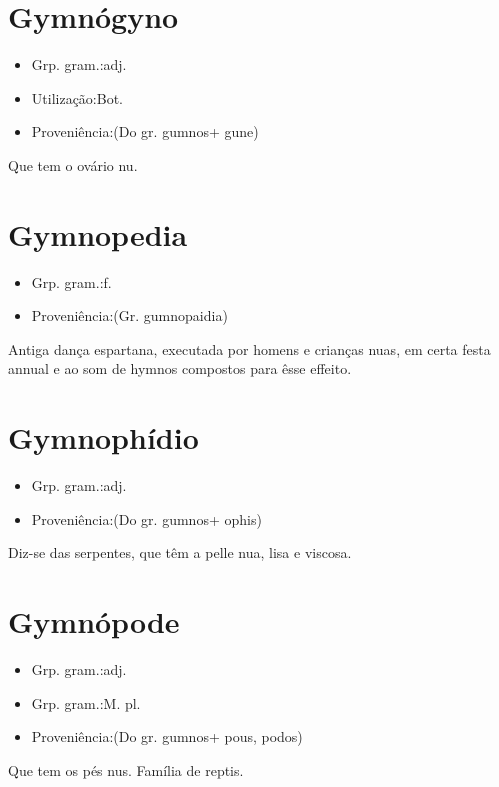 \section{Gymnógyno}
\begin{itemize}
\item {Grp. gram.:adj.}
\end{itemize}
\begin{itemize}
\item {Utilização:Bot.}
\end{itemize}
\begin{itemize}
\item {Proveniência:(Do gr. \textunderscore gumnos\textunderscore  + \textunderscore gune\textunderscore )}
\end{itemize}
Que tem o ovário nu.
\section{Gymnopedia}
\begin{itemize}
\item {Grp. gram.:f.}
\end{itemize}
\begin{itemize}
\item {Proveniência:(Gr. \textunderscore gumnopaidia\textunderscore )}
\end{itemize}
Antiga dança espartana, executada por homens e crianças nuas, em certa festa annual e ao som de hymnos compostos para êsse effeito.
\section{Gymnophídio}
\begin{itemize}
\item {Grp. gram.:adj.}
\end{itemize}
\begin{itemize}
\item {Proveniência:(Do gr. \textunderscore gumnos\textunderscore  + \textunderscore ophis\textunderscore )}
\end{itemize}
Diz-se das serpentes, que têm a pelle nua, lisa e viscosa.
\section{Gymnópode}
\begin{itemize}
\item {Grp. gram.:adj.}
\end{itemize}
\begin{itemize}
\item {Grp. gram.:M. pl.}
\end{itemize}
\begin{itemize}
\item {Proveniência:(Do gr. \textunderscore gumnos\textunderscore  + \textunderscore pous\textunderscore , \textunderscore podos\textunderscore )}
\end{itemize}
Que tem os pés nus.
Família de reptis.

